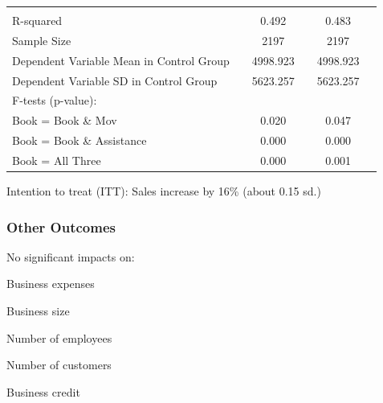 \documentclass[hideothersubsections, usenames,dvipsnames,11pt]{beamer}
\newenvironment{itemize_2pt}{\itemize\addtolength{\itemsep}{2pt}}{\enditemize}
\begin{document}
\begin{frame}
{{\begin{table}[t]
\begin{tabular}{l*{5}{c}}
   	\\
\hline         							
\\
R-squared											  	&& 0.492  	&&  0.483	\\
Sample Size 											&& 2197	&& 2197 	\\
Dependent Variable Mean in Control Group			 	&&         4998.923   &&	          4998.923 	\\
Dependent Variable SD in Control Group				 	&&         5623.257   	&&           5623.257	\\
F-tests (p-value):											&&			&&			\\
\hspace{5mm}Book = Book \& Mov				        	&&            0.020 	&&           0.047 	\\
\hspace{5mm}Book = Book \& Assistance				  			&&0.000   	&& 0.000 	\\
\hspace{5mm}Book = All Three			   			  	&&0.000   	&&0.001  	\\
\hline
	\end{tabular}

\end{table}}}

\vspace{-0.5em}

\begin{itemize_2pt}
\item Intention to treat (ITT): Sales increase by 16\% (about 0.15 sd.)
\end{itemize_2pt}
\end{frame}


\begin{frame}
\frametitle{Other Outcomes}

\textcolor{bdf}{No significant} impacts on:
    \begin{itemize_2pt}
    \vspace{0.1in}
    \item Business expenses
    \vspace{0.1in} 		
    \item Business size
      \vspace{0.1in}
    \item Number of employees
      \vspace{0.1in}
    \item Number of customers
       \vspace{0.1in}
     \item Business credit
    \end{itemize_2pt}

\end{frame}
\end{document}
